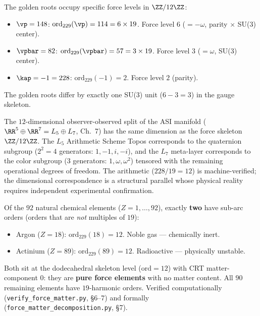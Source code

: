 \begin{corollary}\label{cor:golden-force}
The golden roots occupy specific force levels in $\ZZ/12\ZZ$:
\begin{itemize}
\item $\vp = 148$: $\mathrm{ord}_{229}(\vp) = 114 = 6 \times 19$. Force level $6$ ($= -\omega$, parity $\times$ SU(3) center).
\item $\vpbar = 82$: $\mathrm{ord}_{229}(\vpbar) = 57 = 3 \times 19$. Force level $3$ ($= \omega$, SU(3) center).
\item $\kap = -1 = 228$: $\mathrm{ord}_{229}(-1) = 2$. Force level $2$ (parity).
\end{itemize}
The golden roots differ by exactly one SU(3) unit ($6 - 3 = 3$) in the gauge skeleton.
\end{corollary}

\begin{remark}
The $12$-dimensional observer-observed split of the ASI manifold ($\RR^5 \oplus \RR^7 = L_5 \oplus L_7$, Ch.~7) has the same dimension as the force skeleton $\ZZ/12\ZZ$. The $L_5$ Arithmetic Scheme Topos corresponds to the quaternion subgroup ($2^2 = 4$ generators: $1, -1, i, -i$), and the $L_7$ meta-layer corresponds to the color subgroup ($3$ generators: $1, \omega, \omega^2$) tensored with the remaining operational degrees of freedom. The arithmetic ($228/19 = 12$) is machine-verified; the dimensional correspondence is a structural parallel whose physical reality requires independent experimental confirmation.
\end{remark}

\begin{remark}
Of the $92$ natural chemical elements ($Z = 1, \ldots, 92$), exactly \textbf{two} have sub-arc orders (orders that are \emph{not} multiples of $19$):
\begin{itemize}
\item Argon ($Z = 18$): $\mathrm{ord}_{229}(18) = 12$. Noble gas --- chemically inert.
\item Actinium ($Z = 89$): $\mathrm{ord}_{229}(89) = 12$. Radioactive --- physically unstable.
\end{itemize}
Both sit at the dodecahedral skeleton level ($\mathrm{ord} = 12$) with CRT matter-component $0$: they are \textbf{pure force elements} with no matter content. All $90$ remaining elements have $19$-harmonic orders. Verified computationally (\texttt{verify\_force\_matter.py}, \S 6--7) and formally (\texttt{force\_matter\_decomposition.py}, \S 7).
\end{remark}

